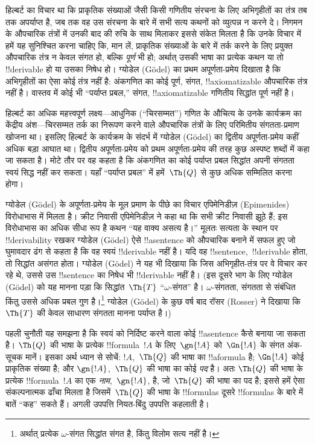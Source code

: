 \documentclass[../../../include/open-logic-section]{subfiles}
\begin{document}


हिल्बर्ट का विचार था कि प्राकृतिक संख्याओं जैसी किसी गणितीय संरचना के लिए
अभिगृहीतों का तंत्र तब तक अपर्याप्त है, जब तक वह उस संरचना के बारे में सभी
सत्य कथनों को व्युत्पन्न न करने दे। निगमन के औपचारिक तंत्रों में उनकी बाद
की रुचि के साथ मिलाकर इससे संकेत मिलता है कि उनके विचार में हमें यह
सुनिश्चित करना चाहिए कि, मान लें, प्राकृतिक संख्याओं के बारे में तर्क करने
के लिए प्रयुक्त औपचारिक तंत्र न केवल संगत हो, बल्कि \emph{पूर्ण} भी हो;
अर्थात् उसकी भाषा का प्रत्येक कथन या तो !!{derivable} हो या उसका निषेध
हो। ग्योडेल (G\"odel) का प्रथम अपूर्णता-प्रमेय दिखाता है कि
अभिगृहीतों का ऐसा कोई तंत्र नहीं है: अंकगणित का कोई पूर्ण, संगत,
!!{axiomatizable} औपचारिक तंत्र नहीं है। वास्तव में कोई भी ``पर्याप्त
प्रबल,'' संगत, !!{axiomatizable} गणितीय सिद्धांत पूर्ण नहीं है।

हिल्बर्ट का अधिक महत्त्वपूर्ण लक्ष्य---आधुनिक (``चिरसम्मत'') गणित के
औचित्य के उनके कार्यक्रम का केंद्रीय अंश---चिरसम्मत तर्क का निरूपण करने
वाले औपचारिक तंत्रों के लिए परिमितीय संगतता-प्रमाण खोजना था। इसलिए हिल्बर्ट
के कार्यक्रम के संदर्भ में ग्योडेल (G\"odel) का द्वितीय अपूर्णता-प्रमेय कहीं अधिक
बड़ा आघात था। द्वितीय अपूर्णता-प्रमेय को प्रथम अपूर्णता-प्रमेय की तरह कुछ
अस्पष्ट शब्दों में कहा जा सकता है। मोटे तौर पर वह कहता है कि अंकगणित का
कोई पर्याप्त प्रबल सिद्धांत अपनी संगतता स्वयं सिद्ध नहीं कर सकता। यहाँ
``पर्याप्त प्रबल'' में हमें~$\Th{Q}$ से कुछ अधिक सम्मिलित करना होगा।

ग्योडेल (G\"odel) के अपूर्णता-प्रमेय के मूल प्रमाण के पीछे का विचार एपिमेनिडीज़
(Epimenides) विरोधाभास में मिलता है। क्रीट निवासी एपिमेनिडीज़ ने कहा था कि
सभी क्रीट निवासी झूठे हैं; इस विरोधाभास का अधिक सीधा रूप है कथन ``यह वाक्य
असत्य है।'' मूलतः सत्यता के स्थान पर !!{derivability} रखकर ग्योडेल (G\"odel) ऐसे
!!a{sentence} को औपचारिक बनाने में सफल हुए जो घुमावदार ढंग से कहता है कि
वह स्वयं !!{derivable} नहीं है। यदि वह !!{sentence},~!!{derivable} होता,
तो सिद्धांत असंगत होता। ग्योडेल (G\"odel) ने यह भी दिखाया कि जिस अभिगृहीत-तंत्र पर
वे विचार कर रहे थे, उससे उस !!{sentence} का निषेध भी !!{derivable} नहीं
है। (इस दूसरे भाग के लिए ग्योडेल (G\"odel) को यह मानना पड़ा कि सिद्धांत~$\Th{T}$
``$\omega$-संगत'' है। $\omega$-संगतता, संगतता से संबंधित किंतु उससे अधिक
प्रबल गुण है।\footnote{अर्थात् प्रत्येक $\omega$-संगत सिद्धांत संगत है,
किंतु विलोम सत्य नहीं है।} ग्योडेल (G\"odel) के कुछ वर्ष बाद रॉसर (Rosser) ने दिखाया
कि~$\Th{T}$ की केवल साधारण संगतता मानना पर्याप्त है।)

पहली चुनौती यह समझना है कि स्वयं को निर्दिष्ट करने वाला कोई !!a{sentence}
कैसे बनाया जा सकता है। $\Th{Q}$ की भाषा के प्रत्येक !!{formula}~$!A$ के
लिए~$\gn{!A}$ को~$\Gn{!A}$ के संगत अंक-सूचक मानें। इसका अर्थ ध्यान से
सोचें: $!A$,~$\Th{Q}$ की भाषा का !!a{formula} है; $\Gn{!A}$ कोई प्राकृतिक
संख्या है; और $\gn{!A}$,~$\Th{Q}$ की भाषा का कोई \emph{पद} है। अतः
$\Th{Q}$ की भाषा के प्रत्येक !!{formula}~$!A$ का एक \emph{नाम},~$\gn{!A}$,
है, जो~$\Th{Q}$ की भाषा का पद है; इससे हमें ऐसा संकल्पनात्मक ढाँचा मिलता
है जिसमें~$\Th{Q}$ की भाषा के !!{formula}s दूसरे !!{formula}s के बारे में
बातें ``कह'' सकते हैं। अगली उपपत्ति नियत-बिंदु उपपत्ति कहलाती है।
\end{document}
